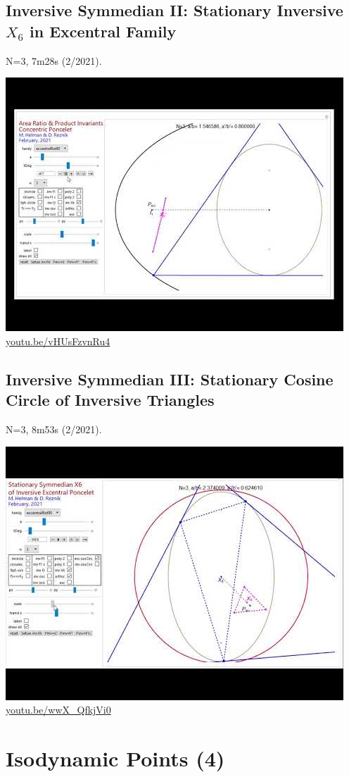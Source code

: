 \documentclass[12pt]{amsart}
\begin{document}
\subsection{Inversive Symmedian II: Stationary Inversive $X_{6}$ in Excentral Family}
\label{vid:vHUsFzvnRu4}
\noindent N=3, 7m28s (2/2021). 
\begin{center}\includegraphics[width=.5\textwidth]{pics/vHUsFzvnRu4.jpg} \\ 
\href{https://youtu.be/vHUsFzvnRu4}{\url{youtu.be/vHUsFzvnRu4}}\end{center}
% 

\subsection{Inversive Symmedian III: Stationary Cosine Circle of Inversive Triangles}
\label{vid:wwX_QfkjVi0}
\noindent N=3, 8m53s (2/2021). 
\begin{center}\includegraphics[width=.5\textwidth]{pics/wwX_QfkjVi0.jpg} \\ 
\href{https://youtu.be/wwX_QfkjVi0}{\url{youtu.be/wwX\_QfkjVi0}}\end{center}
% 


\section{Isodynamic Points (4)}
\end{document}
